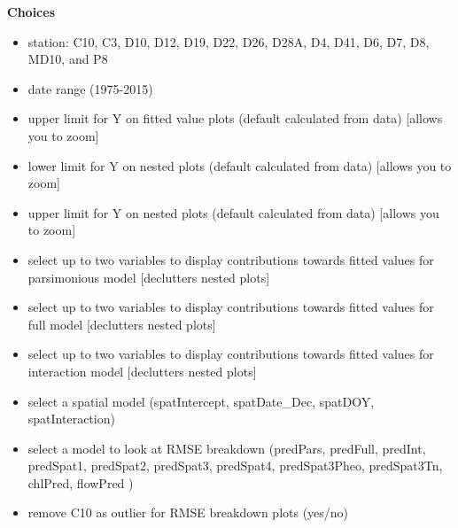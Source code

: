 \documentclass[12pt]{amsart}
\begin{document}
\textbf{Choices}
\begin{itemize}
\item station: C10, C3, D10, D12, D19, D22, D26, D28A, D4, D41, D6, D7, D8, MD10, and P8
\item date range (1975-2015)
\item upper limit for Y on fitted value plots (default calculated from data) [allows you to zoom]
\item lower limit for Y on nested plots (default calculated from data) [allows you to zoom]

\item upper limit for Y on nested plots (default calculated from data) [allows you to zoom]

\item select up to two variables to display contributions towards fitted values for parsimonious model [declutters nested plots]
\item select up to two variables to display contributions towards fitted values for full model [declutters nested plots]
\item select up to two variables to display contributions towards fitted values for interaction model [declutters nested plots]
\item select a spatial model (spatIntercept, spatDate_Dec, spatDOY, spatInteraction)
\item select a model to look at RMSE breakdown (predPars, predFull, predInt, predSpat1, predSpat2, predSpat3, predSpat4, predSpat3Pheo, predSpat3Tn, chlPred, flowPred )
\item remove C10 as outlier for RMSE breakdown plots (yes/no)
\end{itemize}
\end{document}
